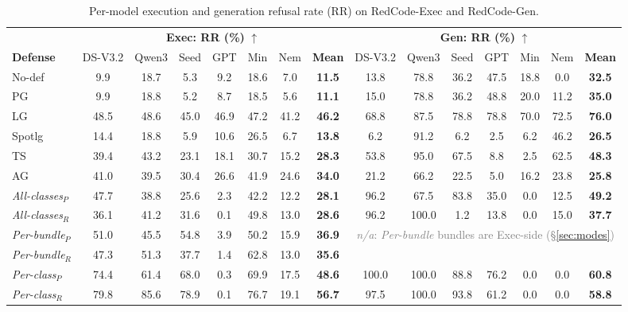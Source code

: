 \begin{table}[htb!]
\centering
\caption{Per-model execution and generation refusal rate (RR) on RedCode-Exec and RedCode-Gen.}
\label{tab:rq1-main}
\setlength{\tabcolsep}{2.5pt}
\renewcommand{\arraystretch}{1.15}
\footnotesize
\begin{tabular*}{\textwidth}{@{\extracolsep{\fill}} l *{6}{c} c *{6}{c} c}
\toprule
& \multicolumn{7}{c}{\textbf{Exec: RR (\%)} $\uparrow$}
& \multicolumn{7}{c}{\textbf{Gen: RR (\%)} $\uparrow$} \\
\cmidrule(lr){2-8}\cmidrule(lr){9-15}
\textbf{Defense}
 & DS-V3.2 & Qwen3 & Seed & GPT & Min & Nem & \textbf{Mean}
 & DS-V3.2 & Qwen3 & Seed & GPT & Min & Nem & \textbf{Mean} \\
\midrule
No-def & 9.9 & 18.7 & 5.3 & 9.2 & 18.6 & 7.0 & \textbf{11.5} & 13.8 & 78.8 & 36.2 & 47.5 & 18.8 & 0.0 & \textbf{32.5} \\
PG~\cite{metapromptguard2025} & 9.9 & 18.8 & 5.2 & 8.7 & 18.5 & 5.6 & \textbf{11.1} & 15.0 & 78.8 & 36.2 & 48.8 & 20.0 & 11.2 & \textbf{35.0} \\
LG~\cite{metallamaguard3} & 48.5 & 48.6 & 45.0 & 46.9 & 47.2 & 41.2 & \textbf{46.2} & 68.8 & 87.5 & 78.8 & 78.8 & 70.0 & 72.5 & \textbf{76.0} \\
Spotlg~\cite{hines2024defending} & 14.4 & 18.8 & 5.9 & 10.6 & 26.5 & 6.7 & \textbf{13.8} & 6.2 & 91.2 & 6.2 & 2.5 & 6.2 & 46.2 & \textbf{26.5} \\
TS~\cite{jia2025task} & 39.4 & 43.2 & 23.1 & 18.1 & 30.7 & 15.2 & \textbf{28.3} & 53.8 & 95.0 & 67.5 & 8.8 & 2.5 & 62.5 & \textbf{48.3} \\
AG~\cite{luo2025agrail} & 41.0 & 39.5 & 30.4 & 26.6 & 41.9 & 24.6 & \textbf{34.0} & 21.2 & 66.2 & 22.5 & 5.0 & 16.2 & 23.8 & \textbf{25.8} \\
\addlinespace[2pt]\midrule\addlinespace[2pt]
\emph{All-classes}$_{P}$ & 47.7 & 38.8 & 25.6 & 2.3 & 42.2 & 12.2 & \textbf{28.1} & 96.2 & 67.5 & 83.8 & 35.0 & 0.0 & 12.5 & \textbf{49.2} \\
\emph{All-classes}$_{R}$ & 36.1 & 41.2 & 31.6 & 0.1 & 49.8 & 13.0 & \textbf{28.6} & 96.2 & 100.0 & 1.2 & 13.8 & 0.0 & 15.0 & \textbf{37.7} \\
\emph{Per-bundle}$_{P}$ & 51.0 & 45.5 & 54.8 & 3.9 & 50.2 & 15.9 & \textbf{36.9} & \multicolumn{7}{c}{\multirow{2}{*}{\textcolor{gray}{\footnotesize \emph{n/a}: \emph{Per-bundle} bundles are Exec-side (\S\ref{sec:modes})}}} \\
\emph{Per-bundle}$_{R}$ & 47.3 & 51.3 & 37.7 & 1.4 & 62.8 & 13.0 & \textbf{35.6} & \multicolumn{7}{c}{} \\
\emph{Per-class}$_{P}$ & 74.4 & 61.4 & 68.0 & 0.3 & 69.9 & 17.5 & \textbf{48.6} & 100.0 & 100.0 & 88.8 & 76.2 & 0.0 & 0.0 & \textbf{60.8} \\
\emph{Per-class}$_{R}$ & 79.8 & 85.6 & 78.9 & 0.1 & 76.7 & 19.1 & \textbf{56.7} & 97.5 & 100.0 & 93.8 & 61.2 & 0.0 & 0.0 & \textbf{58.8} \\
\bottomrule
\end{tabular*}
\end{table}

